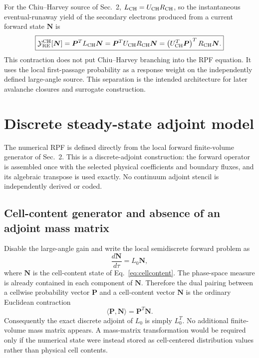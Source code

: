 \documentclass[11pt]{article}
\begin{document}
For the Chiu--Harvey source of Sec.~2,
$L_{\rm CH}=U_{\rm CH}R_{\rm CH}$, so the instantaneous eventual-runaway yield of the
secondary electrons produced from a current forward state $\bm N$ is
\begin{equation}
 \boxed{
 \mathcal Y_{\rm RE}^{\rm CH}[\bm N]
 =\bm P^T L_{\rm CH}\bm N
 =\bm P^T U_{\rm CH}R_{\rm CH}\bm N
 =\left(U_{\rm CH}^T\bm P\right)^T R_{\rm CH}\bm N.
 }
 \label{eq:rpf_ch_contraction}
\end{equation}
This contraction does not put Chiu--Harvey branching into the RPF equation.  It uses the
local first-passage probability as a response weight on the independently defined
large-angle source.  This separation is the intended architecture for later avalanche
closures and surrogate construction.

\section{Discrete steady-state adjoint model}
\label{sec:steady_adjoint_numerics}

The numerical RPF is defined directly from the local forward finite-volume generator of
Sec.~2.  This is a discrete-adjoint construction: the forward operator is assembled once
with the selected physical coefficients and boundary fluxes, and its algebraic transpose
is used exactly.  No continuum adjoint stencil is independently derived or coded.

\subsection{Cell-content generator and absence of an adjoint mass matrix}
\label{sec:rpf_discrete_state}

Disable the large-angle gain and write the local semidiscrete forward problem as
\begin{equation}
 \boxed{
 \frac{d\bm N}{d\tau}=L_0\bm N,
 }
 \label{eq:rpf_forward_semidiscrete}
\end{equation}
where $\bm N$ is the cell-content state of Eq.~\eqref{eq:cellcontent}.  The phase-space
measure is already contained in each component of $\bm N$.  Therefore the dual pairing
between a cellwise probability vector $\bm P$ and a cell-content vector $\bm N$ is the
ordinary Euclidean contraction
\begin{equation}
 \langle\bm P,\bm N\rangle=\bm P^T\bm N.
 \label{eq:rpf_discrete_pairing}
\end{equation}
Consequently the exact discrete adjoint of $L_0$ is simply $L_0^T$.  No additional
finite-volume mass matrix appears.  A mass-matrix transformation would be required only
if the numerical state were instead stored as cell-centered distribution values rather
than physical cell contents.
\end{document}

